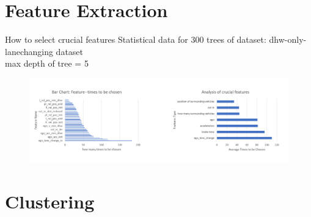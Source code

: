 \documentclass[shortpres]{beamer}
\begin{document}
\section{Feature Extraction}
\begin{frame}{How to select crucial features}
	Statistical data for 300 trees of dataset: dhw-only-lanechanging dataset\\max depth of tree = 5
	\begin{figure}
			\includegraphics[height=0.45\textheight]{fig_FeatureExtraction/StatisticallyAnalysis.png} 
	\end{figure}
\end{frame}

\section{Clustering}	
\end{document}

